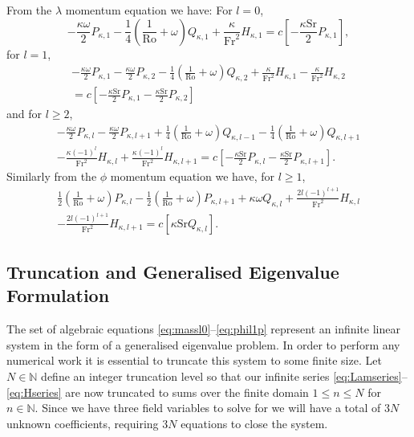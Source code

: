 From the $\lambda$ momentum equation we have: For $l=0$,
\begin{equation}
-\frac{\kappa \omega}{2} P_{\kappa,1}-\frac{1}{4}\left(\frac{1}{\mathrm{Ro}}+\omega \right) Q_{\kappa,1} + \frac{\kappa}{\mathrm{Fr}^2} H_{\kappa,1} = c\left[-\frac{\kappa \mathrm{Sr}}{2} P_{\kappa,1} \right], \label{eq:laml0}
\end{equation}
for $l=1$,
\begin{multline}
-\frac{\kappa \omega}{2} P_{\kappa,1}-\frac{\kappa \omega}{2} P_{\kappa,2}-\frac{1}{4}\left(\frac{1}{\mathrm{Ro}}+\omega \right) Q_{\kappa,2} + \frac{\kappa}{\mathrm{Fr}^2} H_{\kappa,1}- \frac{\kappa}{\mathrm{Fr}^2} H_{\kappa,2} \\
= c\left[-\frac{\kappa \mathrm{Sr}}{2} P_{\kappa,1} -\frac{\kappa \mathrm{Sr}}{2} P_{\kappa,2}\right] \label{eq:laml1}
\end{multline}
and for $l\ge2$,
\begin{multline}
-\frac{\kappa \omega}{2} P_{\kappa,l}-\frac{\kappa \omega}{2} P_{\kappa,l+1}+\frac{1}{4}\left(\frac{1}{\mathrm{Ro}}+\omega \right) Q_{\kappa,l-1}-\frac{1}{4}\left(\frac{1}{\mathrm{Ro}}+\omega \right) Q_{\kappa,l+1} \\- \frac{\kappa(-1)^l}{\mathrm{Fr}^2} H_{\kappa,l}+ \frac{\kappa(-1)^l}{\mathrm{Fr}^2} H_{\kappa,l+1}
= c\left[-\frac{\kappa \mathrm{Sr}}{2} P_{\kappa,l} -\frac{\kappa \mathrm{Sr}}{2} P_{\kappa,l+1}\right]. \label{eq:laml2p}
\end{multline}
Similarly from the $\phi$ momentum equation we have, for $l\ge1$,
\begin{multline}
\frac{1}{2}\left(\frac{1}{\mathrm{Ro}}+\omega \right)P_{\kappa,l}-\frac{1}{2}\left(\frac{1}{\mathrm{Ro}}+\omega \right)P_{\kappa,l+1}+\kappa \omega Q_{\kappa,l} + \frac{2l(-1)^{l+1}}{\mathrm{Fr}^2} H_{\kappa,l}\\- \frac{2l(-1)^{l+1}}{\mathrm{Fr}^2} H_{\kappa,l+1}=c\left[\kappa \mathrm{Sr} Q_{\kappa,l}\right]. \label{eq:phil1p}
\end{multline}

\subsection{Truncation and Generalised Eigenvalue Formulation}
The set of algebraic equations \eqref{eq:massl0}--\eqref{eq:phil1p} represent an infinite linear system in the form of a generalised eigenvalue problem. In order to perform any numerical work it is essential to truncate this system to some finite size. Let $N\in\mathbf{\mathbb{N}}$ define an integer truncation level so that our infinite series \eqref{eq:Lamseries}--\eqref{eq:Hseries} are now truncated to sums over the finite domain $1\le n \le N$ for $n\in\mathbf{\mathbb{N}}$. Since we have three field variables to solve for we will have a total of $3N$ unknown coefficients, requiring $3N$ equations to close the system. 

